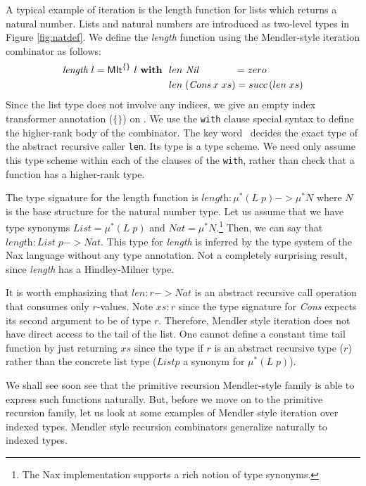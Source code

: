 A typical example of iteration is the length function for lists which
returns a natural number. Lists and natural numbers are introduced as two-level types
in Figure \ref{fig:natdef}. We define the \textit{length} function using the Mendler-style
iteration combinator as follows:
\begin{align*}
\textit{length}~l = \textsf{MIt}^{\{\}}~l~\textbf{with}~~
&  len ~\textit{Nil}~~~~~~~~~~~ = zero \\
&  len \;(\textit{Cons}\;x\;xs) = succ\,(len\;xs)
\end{align*}
Since the list type does not involve any indices, we give an empty index
transformer annotation ($\{\}$) on \MIt. We use the \verb+with+ clause special
syntax to define the higher-rank body of the combinator. The key word  \MIt\ 
decides the exact type of the abstract recursive caller \verb+len+. Its
type is a type scheme. We need only assume this type scheme within each of the
clauses of the \verb+with+, rather than check that a function has a higher-rank type.

The type signature for the length
function is $\textit{length}:\mu^{*}(L\;p) -> \mu^{*}N$ where $N$ is the
base structure for the natural number type. Let us assume that we have
type synonyms $\textit{List} = \mu^{*}(L\;p)$ and
$\textit{Nat} = \mu^{*}N $.\footnote{The Nax implementation supports a rich notion of type synonyms.}
Then, we can say that $\textit{length}:\textit{List}\;p -> \textit{Nat}$.
This type for \textit{length} is inferred by the type system of
the Nax language without any type annotation. Not a completely surprising
result, since \textit{length} has a Hindley-Milner type.

It is worth emphasizing that $len : r -> \textit{Nat}$ is an abstract recursive
call operation that consumes only $r$-values. Note $xs:r$ since the type signature
for \textit{Cons} expects its second argument to be of type $r$. Therefore,
Mendler style iteration does not have direct access to the tail of the list.
One cannot define a constant time tail function by just returning
$xs$ since the type if $r$ is an abstract recursive type ($r$) rather than
the concrete list type ($List p$ a synonym for $\mu^{*}(L\;p)$). 

We shall see soon see that the primitive recursion Mendler-style
family is able to express such functions naturally. But,
before we move on to the primitive recursion family,
let us look at some examples of Mendler style iteration over indexed types.
Mendler style recursion combinators generalize naturally to indexed types.

